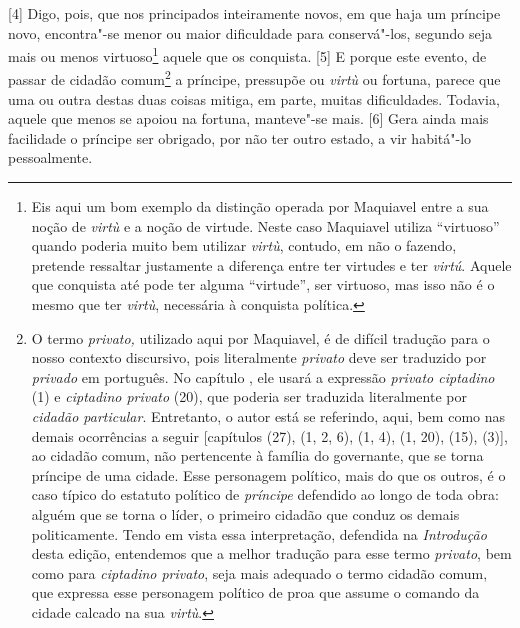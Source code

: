 {[}4{]} Digo, pois, que nos principados inteiramente novos, em que haja
um príncipe novo, encontra"-se menor ou maior dificuldade para
conservá"-los, segundo seja mais ou menos virtuoso\footnote{Eis aqui um
  bom exemplo da distinção operada por Maquiavel entre a sua noção de
  \emph{virtù} e a noção de virtude. Neste caso Maquiavel utiliza
  ``virtuoso'' quando poderia muito bem utilizar \emph{virtù}, contudo,
  em não o fazendo, pretende ressaltar justamente a diferença entre ter
  virtudes e ter \emph{virtú}. Aquele que conquista até pode ter alguma
  ``virtude'', ser virtuoso, mas isso não é o mesmo que ter
  \emph{virtù}, necessária à conquista política.} aquele que os
conquista. {[}5{]} E porque este evento, de passar de cidadão
comum\footnote{O termo \emph{privato,} utilizado aqui por Maquiavel, é
  de difícil tradução para o nosso contexto discursivo, pois
  literalmente \emph{privato} deve ser traduzido por \emph{privado} em
  português. No capítulo , ele usará a expressão \emph{privato
  ciptadino} (1) e \emph{ciptadino privato} (20), que poderia ser
  traduzida literalmente por \emph{cidadão particular}. Entretanto, o
  autor está se referindo, aqui, bem como nas demais ocorrências a
  seguir {[}capítulos  (27),  (1, 2, 6),  (1, 4),  (1, 20),
   (15),  (3){]}, ao cidadão comum, não pertencente à família do
  governante, que se torna príncipe de uma cidade. Esse personagem
  político, mais do que os outros, é o caso típico do estatuto político
  de \emph{príncipe} defendido ao longo de toda obra: alguém que se
  torna o líder, o primeiro cidadão que conduz os demais politicamente.
  Tendo em vista essa interpretação, defendida na \emph{Introdução}
  desta edição, entendemos que a melhor tradução para esse termo
  \emph{privato}, bem como para \emph{ciptadino privato}, seja mais
  adequado o termo cidadão comum, que expressa esse personagem político
  de proa que assume o comando da cidade calcado na sua \emph{virtù}.} a
príncipe, pressupõe ou \emph{virtù} ou fortuna, parece que uma ou outra
destas duas coisas mitiga, em parte, muitas dificuldades. Todavia,
aquele que menos se apoiou na fortuna, manteve"-se mais. {[}6{]} Gera
ainda mais facilidade o príncipe ser obrigado, por não ter outro estado,
a vir habitá"-lo pessoalmente.

